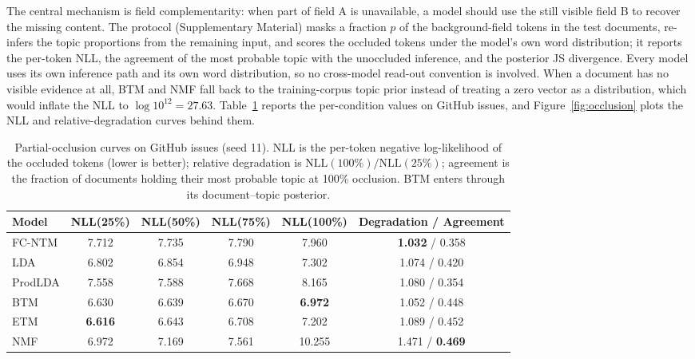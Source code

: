 \documentclass[11pt]{article}
\newcommand{\fcntm}{FC-NTM}
\begin{document}
The central mechanism is field complementarity: when part of field A is unavailable, a model should
use the still visible field B to recover the missing content. The protocol (Supplementary Material)
masks a fraction $p$ of the background-field tokens in the test documents, re-infers the topic
proportions from the remaining input, and scores the occluded tokens under the model's own word
distribution; it reports the per-token NLL, the agreement of the most probable topic with the
unoccluded inference, and the posterior JS divergence. Every model uses its own inference path and
its own word distribution, so no cross-model read-out convention is involved. When a document has
no visible evidence at all, BTM and NMF fall back to the training-corpus topic prior instead of
treating a zero vector as a distribution, which would inflate the NLL to $\log 10^{12}=27.63$.
Table~\ref{tab:occl-robust} reports the per-condition values on GitHub issues, and
Figure~\ref{fig:occlusion} plots the NLL and relative-degradation curves behind them.

\begin{table}[t]
\centering
\caption{Partial-occlusion curves on GitHub issues (seed 11). NLL is the per-token negative log-likelihood of the occluded tokens (lower is better); relative degradation is $\mathrm{NLL}(100\%)/\mathrm{NLL}(25\%)$; agreement is the fraction of documents holding their most probable topic at 100\% occlusion. BTM enters through its document--topic posterior.}
\label{tab:occl-robust}
\footnotesize
\setlength{\tabcolsep}{3pt}
\begin{tabular}{@{}lccccc@{}}
\toprule
Model & NLL(25\%) & NLL(50\%) & NLL(75\%) & NLL(100\%) & Degradation / Agreement \\
\midrule
\fcntm{} & 7.712 & 7.735 & 7.790 & 7.960 & \textbf{1.032} / 0.358 \\
LDA & 6.802 & 6.854 & 6.948 & 7.302 & 1.074 / 0.420 \\
ProdLDA & 7.558 & 7.588 & 7.668 & 8.165 & 1.080 / 0.354 \\
BTM & 6.630 & 6.639 & 6.670 & \textbf{6.972} & 1.052 / 0.448 \\
ETM & \textbf{6.616} & 6.643 & 6.708 & 7.202 & 1.089 / 0.452 \\
NMF & 6.972 & 7.169 & 7.561 & 10.255 & 1.471 / \textbf{0.469} \\
\bottomrule
\end{tabular}
\end{table}
\end{document}
